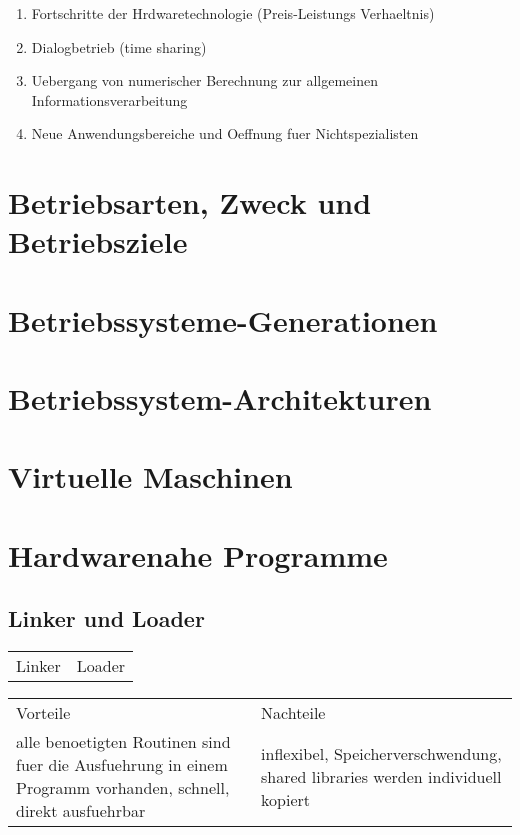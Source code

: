 \begin{enumerate}
	\setlength\itemsep{0em}
	\item Fortschritte der Hrdwaretechnologie (Preis-Leistungs Verhaeltnis)
	\item Dialogbetrieb (time sharing)
	\item Uebergang von numerischer Berechnung zur allgemeinen Informationsverarbeitung
	\item Neue Anwendungsbereiche und Oeffnung fuer Nichtspezialisten 
\end{enumerate}

\section{Betriebsarten, Zweck und Betriebsziele}

\section{Betriebssysteme-Generationen}

\section{Betriebssystem-Architekturen}

\section{Virtuelle Maschinen}

\section{Hardwarenahe Programme}
\subsection{Linker und Loader}
\begin{tabularx}{\textwidth}{X X}
	Linker&			Loader \\
\end{tabularx}

\begin{tabularx}{\textwidth}{X X}
	Vorteile& Nachteile\\
	alle benoetigten Routinen sind fuer die Ausfuehrung in einem Programm vorhanden, schnell, direkt ausfuehrbar& inflexibel, Speicherverschwendung, shared libraries werden individuell kopiert\\ 
\end{tabularx}
